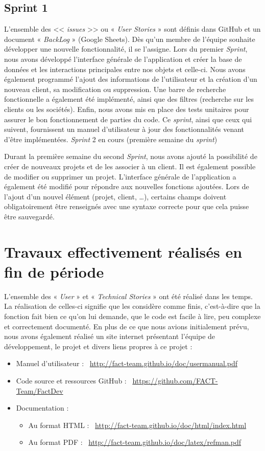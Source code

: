 \documentclass[12pt,a4paper,openany]{article}
\begin{document}
	\subsection{Sprint 1}
	L'ensemble des << \textit{issues} >> ou « \textit{User Stories} » sont définis dans GitHub et un document « \textit{BackLog} » (Google Sheets). Dès qu'un membre de l'équipe
	souhaite développer une nouvelle fonctionnalité, il se l'assigne. Lors du premier \textit{Sprint}, nous avons développé l'interface générale de
	l'application et créer la base de données et les interactions principales entre nos objets et celle-ci. Nous avons également programmé l'ajout des
	informations de l'utilisateur et la création d’un nouveau client, sa modification ou suppression. Une barre de recherche fonctionnelle a également
	été implémenté, ainsi que des filtres (recherche sur les clients ou les sociétés). Enfin, nous avons mis en place des tests unitaires pour assurer
	le bon fonctionnement de parties du code. 
	Ce \textit{sprint}, ainsi que ceux qui suivent, fournissent un manuel d’utilisateur à jour des fonctionnalités venant d’être implémentées.  
	\textit{Sprint} 2 en cours (première semaine du \textit{sprint})

	Durant la première semaine du second \textit{Sprint}, nous avons ajouté la possibilité de créer de nouveaux projets et de les associer à un client. Il est
	également possible de modifier ou supprimer un projet. L'interface générale de l’application a également été modifié pour répondre aux nouvelles
	fonctions ajoutées. Lors de l’ajout d’un nouvel élément (projet, client, …), certains champs doivent obligatoirement être renseignés avec une
	syntaxe correcte pour que cela puisse être sauvegardé. 

	\section{Travaux effectivement réalisés en fin de période}
	L'ensemble des « \textit{User} » et « \textit{Technical Stories} » ont été réalisé dans les temps. La réalisation de celles-ci signifie que les considère comme
	finis, c'est-à-dire que la fonction fait bien ce qu'on lui demande, que le code est facile à lire, peu complexe et correctement documenté. 
	En plus de ce que nous avions initialement prévu, nous avons également réalisé un site internet présentant l'équipe de développement, le projet et
	divers liens propres à ce projet :
	\begin{itemize}
		\item Manuel d’utilisateur : \Mundus~\url{http://fact-team.github.io/doc/usermanual.pdf}
		\item Code source et ressources GitHub : \Mundus~\url{https://github.com/FACT-Team/FactDev}
		\item Documentation :
			\begin{itemize}
				\item Au format HTML : \Mundus~\url{http://fact-team.github.io/doc/html/index.html}
				\item Au format PDF :  \Mundus~\url{http://fact-team.github.io/doc/latex/refman.pdf}
			\end{itemize}
	\end{itemize}
\end{document}
